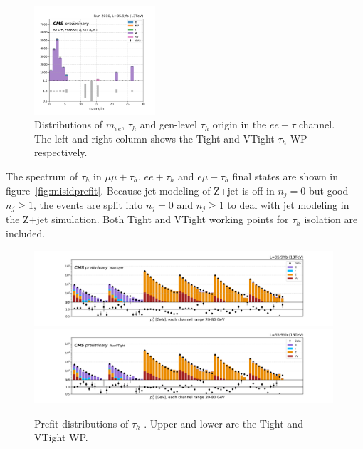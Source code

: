\begin{figure}
    \includegraphics[width=0.4\textwidth]{chapters/Appendix/sectionJetToTauh/figures/eetau_tauGenFlavor_pickles_lltauVTight.png}
    \caption{Distributions of $m_{ee}$, $\tau_h$ \pt and gen-level $\tau_h$ origin in the $ee+\tau$ channel. The left and right column shows the Tight and VTight $\tau_h$ WP respectively.}
    \label{fig:appendix:fakeTauId:eetau}
\end{figure}


The \pt spectrum of $\tau_h$ in $\mu\mu+\tau_h$, $ee+\tau_h$ and
$e\mu+\tau_h$ final states are shown in figure~\ref{fig:misidprefit}.
Because jet modeling of Z+jet is off in $n_j=0$ but good $n_j \geq 1$,
the events are split into $n_j=0$ and $n_j \geq 1$ to deal with jet
modeling in the Z+jet simulation. Both Tight and VTight working
points for $\tau_h$ isolation are included.



\begin{figure}
    \centering
    \includegraphics[width=0.99\textwidth]{chapters/Appendix/sectionJetToTauh/figures/2020_tauID_prefit_lltauTight.png}
    \includegraphics[width=0.99\textwidth]{chapters/Appendix/sectionJetToTauh/figures/2020_tauID_prefit_lltauVTight.png}
    \caption{Prefit distributions of $\tau_h$ \pt. Upper and lower are the Tight and VTight WP.}
    \label{fig:appendix:fakeTauId:prefit}
\end{figure}

